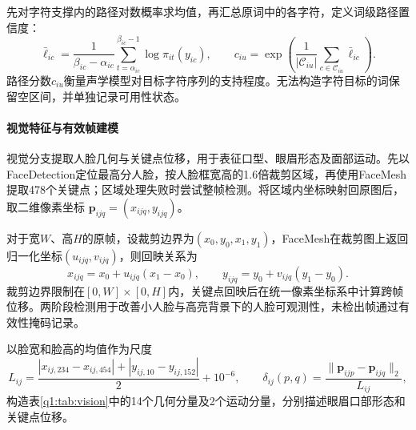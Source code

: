 先对字符支撑内的路径对数概率求均值，再汇总原词中的各字符，定义词级路径置信度：
\begin{equation}
\bar\ell_{ic}=\frac{1}{\beta_{ic}-\alpha_{ic}}
\sum_{t=\alpha_{ic}}^{\beta_{ic}-1}\log\pi_{it}(y_{ic}),
\qquad
c_{iu}=\exp\left(\frac{1}{|\mathcal C_{iu}|}\sum_{c\in\mathcal C_{iu}}\bar\ell_{ic}\right).
\label{q1:eq:confidence}
\end{equation}
路径分数$c_{iu}$衡量声学模型对目标字符序列的支持程度。无法构造字符目标的词保留空区间，并单独记录可用性状态。

\paragraph{视觉特征与有效帧建模}

视觉分支提取人脸几何与关键点位移，用于表征口型、眼眉形态及面部运动。先以FaceDetection定位最高分人脸，按人脸框宽高的1.6倍裁剪区域，再使用FaceMesh提取478个关键点；区域处理失败时尝试整帧检测。将区域内坐标映射回原图后，取二维像素坐标 $\bm p_{ijq}=(x_{ijq},y_{ijq})$。

对于宽$W$、高$H$的原帧，设裁剪边界为$(x_0,y_0,x_1,y_1)$，FaceMesh在裁剪图上返回归一化坐标$(u_{ijq},v_{ijq})$，则回映关系为
\begin{equation}
x_{ijq}=x_0+u_{ijq}(x_1-x_0),\qquad
y_{ijq}=y_0+v_{ijq}(y_1-y_0).
\label{q1:eq:roi-map}
\end{equation}
裁剪边界限制在$[0,W]\times[0,H]$内，关键点回映后在统一像素坐标系中计算跨帧位移。两阶段检测用于改善小人脸与高亮背景下的人脸可观测性，未检出帧通过有效性掩码记录。

以脸宽和脸高的均值作为尺度
\begin{equation}
L_{ij}=\frac{|x_{ij,234}-x_{ij,454}|+|y_{ij,10}-y_{ij,152}|}{2}+10^{-6},
\qquad
\delta_{ij}(p,q)=\frac{\|\bm p_{ijp}-\bm p_{ijq}\|_2}{L_{ij}},
\label{q1:eq:face-scale}
\end{equation}
构造表\ref{q1:tab:vision}中的14个几何分量及2个运动分量，分别描述眼眉口部形态和关键点位移。

